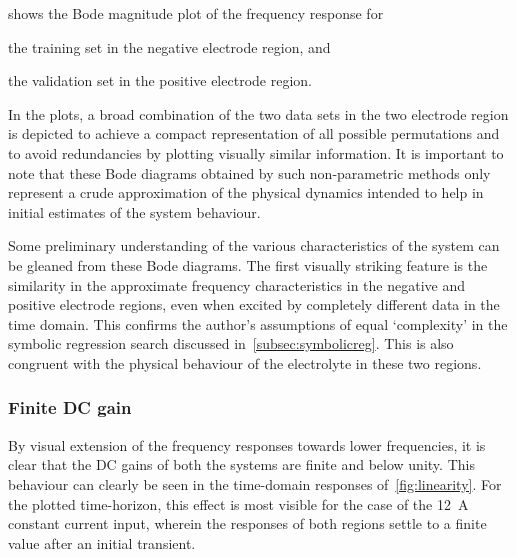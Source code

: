   shows  the  Bode  magnitude  plot  of  the  frequency
response for
\begin{enumerate*}[label=\emph{\alph*})]
    \item the training set in the negative electrode region, and
    \item the validation set in the positive electrode region.
\end{enumerate*}
In the  plots, a broad  combination of  the two data  sets in the  two electrode
region  is  depicted  to  achieve  a  compact  representation  of  all  possible
permutations and to avoid redundancies by plotting visually similar information.
It is important to note that these Bode diagrams obtained by such non-parametric
methods only represent  a crude approximation of the  physical dynamics intended
to help in initial estimates of the system behaviour.

Some preliminary understanding of the  various characteristics of the system can
be gleaned from these Bode diagrams.  The first visually striking feature is the
similarity  in the  approximate frequency  characteristics in  the negative  and
positive electrode  regions, even when  excited by completely different  data in
the time domain. This confirms the author's assumptions of equal `complexity' in
the symbolic  regression search discussed in~\cref{subsec:symbolicreg}.  This is
also  congruent with  the physical  behaviour of  the electrolyte  in these  two
regions.

\subsubsection*{Finite DC gain}
By visual  extension of  the frequency responses  towards lower  frequencies, it
is  clear  that  the  DC  gains  of  both  the  systems  are  finite  and  below
unity.  This  behaviour  can  clearly  be  seen  in  the  time-domain  responses
of~\cref{fig:linearity}.  For  the plotted  time-horizon,  this  effect is  most
visible for the case of the \SI{12}{\ampere} constant current input, wherein the
responses of both regions settle to a finite value after an initial transient.

